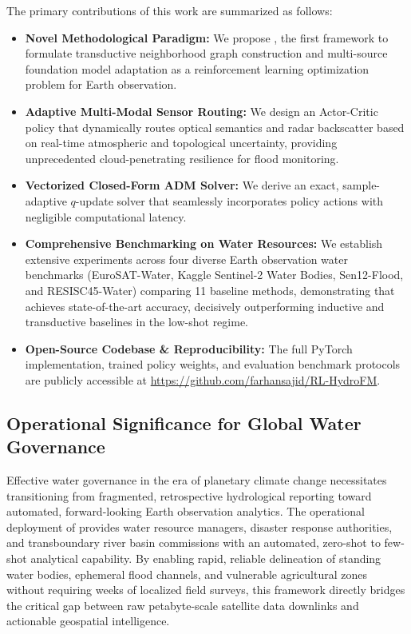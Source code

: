 The primary contributions of this work are summarized as follows:
\begin{itemize}
    \item \textbf{Novel Methodological Paradigm:} We propose \rllctim{}, the first framework to formulate transductive neighborhood graph construction and multi-source foundation model adaptation as a reinforcement learning optimization problem for Earth observation.
    \item \textbf{Adaptive Multi-Modal Sensor Routing:} We design an Actor-Critic policy that dynamically routes optical semantics and radar backscatter based on real-time atmospheric and topological uncertainty, providing unprecedented cloud-penetrating resilience for flood monitoring.
    \item \textbf{Vectorized Closed-Form ADM Solver:} We derive an exact, sample-adaptive $q$-update solver that seamlessly incorporates policy actions with negligible computational latency.
    \item \textbf{Comprehensive Benchmarking on Water Resources:} We establish extensive experiments across four diverse Earth observation water benchmarks (EuroSAT-Water, Kaggle Sentinel-2 Water Bodies, Sen12-Flood, and RESISC45-Water) comparing 11 baseline methods, demonstrating that \rllctim{} achieves state-of-the-art accuracy, decisively outperforming inductive and transductive baselines in the low-shot regime.
    \item \textbf{Open-Source Codebase \& Reproducibility:} The full PyTorch implementation, trained policy weights, and evaluation benchmark protocols are publicly accessible at \url{https://github.com/farhansajid/RL-HydroFM}.
\end{itemize}

\subsection{Operational Significance for Global Water Governance}
Effective water governance in the era of planetary climate change necessitates transitioning from fragmented, retrospective hydrological reporting toward automated, forward-looking Earth observation analytics. The operational deployment of \rllctim{} provides water resource managers, disaster response authorities, and transboundary river basin commissions with an automated, zero-shot to few-shot analytical capability. By enabling rapid, reliable delineation of standing water bodies, ephemeral flood channels, and vulnerable agricultural zones without requiring weeks of localized field surveys, this framework directly bridges the critical gap between raw petabyte-scale satellite data downlinks and actionable geospatial intelligence.


